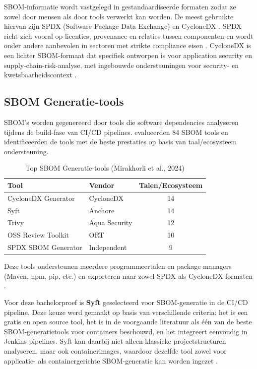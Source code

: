 SBOM-informatie wordt vastgelegd in gestandaardiseerde formaten zodat ze zowel door mensen als door tools verwerkt kan worden. De meest gebruikte hiervan zijn SPDX (Software Package Data Exchange) en CycloneDX \autocite{Stalnaker2024}. SPDX richt zich vooral op licenties, provenance en relaties tussen componenten en wordt onder andere aanbevolen in sectoren met strikte compliance eisen \autocite{Stalnaker2024}. CycloneDX is een lichter SBOM-formaat dat specifiek ontworpen is voor application security en supply-chain-risk-analyse, met ingebouwde ondersteuningen voor security- en kwetsbaarheidscontext \autocite{Stalnaker2024}.

\subsection{SBOM Generatie-tools}

SBOM's worden gegenereerd door tools die software dependencies analyseren tijdens de build-fase van CI/CD pipelines. \textcite{Mirakhorli2024} evalueerden 84 SBOM tools en identificeerden de tools met de beste prestaties op basis van taal/ecosysteem ondersteuning.

\begin{table}[H]
  \centering
  \caption{Top SBOM Generatie-tools (Mirakhorli et al., 2024)}
  \begin{tabular}{|l|l|c|}
  \hline
  \textbf{Tool} & \textbf{Vendor} & \textbf{Talen/Ecosysteem} \\
  \hline
  CycloneDX Generator & CycloneDX & 14 \\
  Syft & Anchore & 14 \\
  Trivy & Aqua Security & 12 \\
  OSS Review Toolkit & ORT & 10 \\
  SPDX SBOM Generator & Independent & 9 \\
  \hline
  \end{tabular}
  \label{tab:sbom-tools}
\end{table}

Deze tools ondersteunen meerdere programmeertalen en package managers (Maven, npm, pip, etc.) en exporteren naar zowel SPDX als CycloneDX formaten \autocite{Mirakhorli2024}. 

Voor deze bachelorproef is \textbf{Syft} geselecteerd voor SBOM-generatie in de CI/CD pipeline. Deze keuze werd gemaakt op basis van verschillende criteria: het is een gratis en open source tool, het is in de voorgaande literatuur als één van de beste SBOM-generatietools voor containers beschouwd, en het integreert eenvoudig in Jenkins-pipelines. Syft kan daarbij niet alleen klassieke projectstructuren analyseren, maar ook containerimages, waardoor dezelfde tool zowel voor applicatie- als containergerichte SBOM-generatie kan worden ingezet \autocite{SyftGithub,AnchoreOpensource}.

